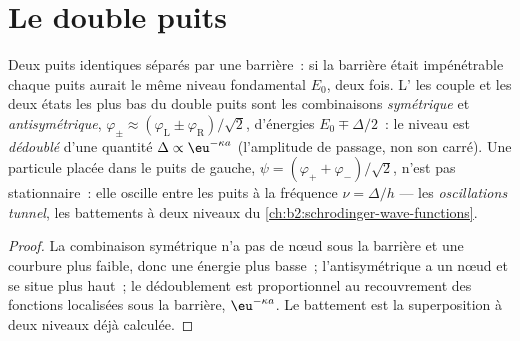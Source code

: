 \section{Le double puits}

\begin{proposition}\label{prop:b2:potential-wells-tunneling:double}
Deux puits identiques séparés par une barrière~: si la barrière était
impénétrable chaque puits aurait le même niveau fondamental $E_0$, deux fois.
L' les couple et les deux états les plus bas du double puits
sont les combinaisons \emph{symétrique} et \emph{antisymétrique},
$\varphi_\pm \approx (\varphi_{\text{L}} \pm \varphi_{\text{R}})/\sqrt2$, d'énergies
$E_0 \mp \Delta/2$~: le niveau est \emph{dédoublé} d'une quantité $\Delta \propto
\eu^{-\kappa a}$ (l'amplitude de passage, non son carré). Une particule
placée dans le puits de gauche, $\psi = (\varphi_+ + \varphi_-)/\sqrt2$, n'est pas
stationnaire~: elle oscille entre les puits à la fréquence
$\nu = \Delta/h$ --- les \emph{oscillations tunnel}, les battements à deux niveaux du
\cref{ch:b2:schrodinger-wave-functions}.
\end{proposition}

\begin{proof}
La combinaison symétrique n'a pas de nœud sous la barrière et une courbure
plus faible, donc une énergie plus basse~; l'antisymétrique a un nœud et
se situe plus haut~; le dédoublement est proportionnel au recouvrement des fonctions
localisées sous la barrière, $\eu^{-\kappa a}$. Le battement est
la superposition à deux niveaux déjà calculée.
\end{proof}

